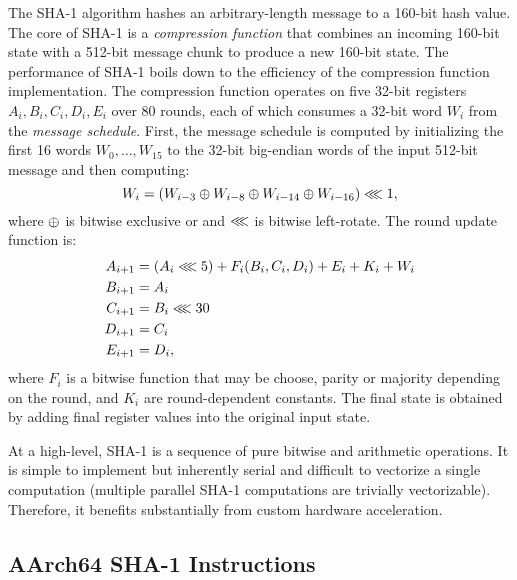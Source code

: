 The SHA-1 algorithm hashes an arbitrary-length message to a 160-bit hash value.
The core of SHA-1 is a \emph{compression function} that combines an incoming
160-bit state with a 512-bit message chunk to produce a new 160-bit state. The
performance of SHA-1 boils down to the efficiency of the compression function
implementation. The compression function operates on five 32-bit registers $A_i,
B_i, C_i, D_i, E_i$ over 80 rounds, each of which consumes a 32-bit word $W_i$
from the \emph{message schedule}. First, the message schedule is computed by
initializing the first 16 words $W_0, \ldots, W_{15}$ to the 32-bit big-endian
words of the input 512-bit message and then computing:
%
\begin{equation*}
W_i = \left( W_{i-3} \oplus W_{i-8} \oplus W_{i-14} \oplus W_{i-16} \right) \lll 1,
\end{equation*}
%
where $\oplus$ is bitwise exclusive or and $\lll$ is bitwise left-rotate.
The round update function is:
%
\begin{align*}
A_{i+1} &= \left( A_i \lll 5 \right) + F_i(B_i, C_i, D_i) + E_i + K_i + W_i \\
B_{i+1} &= A_i \\
C_{i+1} &= B_i \lll 30 \\
D_{i+1} &= C_i \\
E_{i+1} &= D_i,
\end{align*}
%
where $F_i$ is a bitwise function that may be choose, parity or majority
depending on the round, and $K_i$ are round-dependent constants.  The final
state is obtained by adding final register values into the original input state.

At a high-level, SHA-1 is a sequence of pure bitwise and arithmetic operations.
It is simple to implement but inherently serial and difficult to vectorize a
single computation (multiple parallel SHA-1 computations are trivially
vectorizable). Therefore, it benefits substantially from custom hardware
acceleration.

\subsection{AArch64 SHA-1 Instructions}

